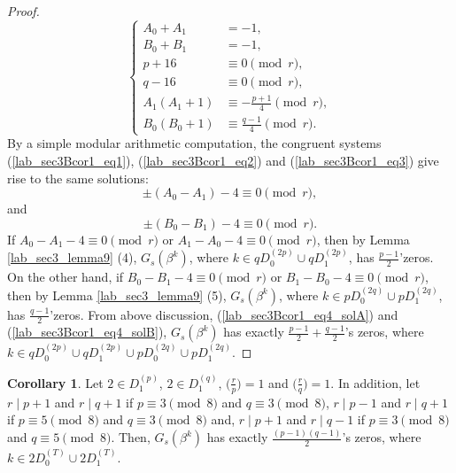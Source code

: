 \documentclass{mcom-l}
\theoremstyle{definition}
\newtheorem{sec3Bcor2}[sec3Bcor1]{Corollary}
\numberwithin{equation}{section}
\begin{document}
\begin{proof}
    \begin{equation}\label{lab_sec3Bcor1_eq3}
    \begin{cases}
    A_{0}+A_{1}&=-1,\\
    B_{0}+B_{1}&=-1,\\
    p+16&\equiv 0 \pmod r,\\
    q-16&\equiv 0 \pmod r,\\
    A_{1}(A_{1}+1)&\equiv -\frac{p+1}{4} \pmod r,\\
    B_{0}(B_{0}+1)&\equiv \frac{q-1}{4} \pmod r.
    \end{cases}
    \end{equation}
    By a simple modular arithmetic computation, the congruent systems (\ref{lab_sec3Bcor1_eq1}), (\ref{lab_sec3Bcor1_eq2}) and (\ref{lab_sec3Bcor1_eq3}) give rise to the same solutions:
    \begin{equation}\label{lab_sec3Bcor1_eq4_solA}
     \pm(A_{0}-A_{1})-4\equiv 0 \pmod r,
    \end{equation}
    and
    \begin{equation}\label{lab_sec3Bcor1_eq4_solB}
       \pm(B_{0}-B_{1})-4\equiv 0 \pmod r.
    \end{equation}
    If $ A_{0}-A_{1}-4\equiv 0 \pmod r $ or $ A_{1}-A_{0}-4\equiv 0 \pmod r $, then by Lemma \ref{lab_sec3_lemma9} (4), $ G_{s}(\beta^{k}) $, where $ k\in qD_{0}^{(2p)}\cup  qD_{1}^{(2p)}$, has $ \tfrac{p-1}{2} $'zeros. On the other hand, if $ B_{0}-B_{1}-4\equiv 0 \pmod r $ or $ B_{1}-B_{0}-4\equiv 0 \pmod r $, then by Lemma \ref{lab_sec3_lemma9} (5), $ G_{s}(\beta^{k}) $, where $ k\in pD_{0}^{(2q)}\cup  pD_{1}^{(2q)}$, has $ \tfrac{q-1}{2} $'zeros. From above discussion, (\ref{lab_sec3Bcor1_eq4_solA}) and (\ref{lab_sec3Bcor1_eq4_solB}), $ G_{s}(\beta^{k}) $ has exactly $ \tfrac{p-1}{2}+\tfrac{q-1}{2} $'s zeros, where $ k\in qD_{0}^{(2p)}\cup  qD_{1}^{(2p)}\cup pD_{0}^{(2q)}\cup  pD_{1}^{(2q)} $.
   \end{proof}
    \begin{sec3Bcor2}\label{lab_sec3Bcor2}
    Let $ 2\in D_{1}^{(p)} $, $ 2\in D_{1}^{(q)} $, $ \bigl(\tfrac{r}{p}\bigr) =1$ and $ \bigl(\tfrac{r}{q}\bigr) =1$. In addition, let $ r\mid p+1 $ and $ r\mid q+1 $ if $ p\equiv 3 \pmod 8 $ and $ q\equiv 3 \pmod 8 $, $ r\mid p-1 $ and $ r\mid q+1 $ if $ p\equiv 5 \pmod 8 $ and $ q\equiv 3 \pmod 8 $ and, $ r\mid p+1 $ and $ r\mid q-1 $ if $ p\equiv 3 \pmod 8 $ and $ q\equiv 5 \pmod 8 $. Then, $ G_{s}(\beta^{k}) $ has exactly $ \tfrac{(p-1)(q-1)}{2} $'s zeros, where $ k\in 2D_{0}^{(T)}\cup 2D_{1}^{(T)} $.
    \end{sec3Bcor2}
\end{document}
